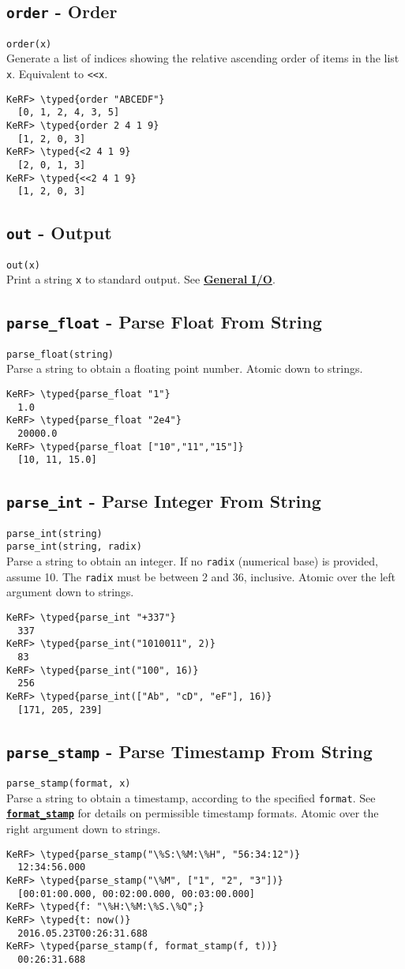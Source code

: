 \documentclass{article}
\newcommand{\typed}[1]{\textcolor{TealBlue}{#1}}
\newcommand{\primdefu}[3]{\subsection{\texttt{#1} - #2}\label{prim:#3}}
\newcommand{\primu}[2]{\hyperref[prim:#2]{\textbf{\texttt{#1}}}}
\newcommand{\primdef}[2]{\primdefu{#1}{#2}{#1}}
\begin{document}
\primdef{order}{Order}
\texttt{order(x)}\\

Generate a list of indices showing the relative ascending order of items in the list \texttt{x}. Equivalent to \texttt{<<x}.
\begin{Verbatim}
KeRF> \typed{order "ABCEDF"}
  [0, 1, 2, 4, 3, 5]
KeRF> \typed{order 2 4 1 9}
  [1, 2, 0, 3]
KeRF> \typed{<2 4 1 9}
  [2, 0, 1, 3]
KeRF> \typed{<<2 4 1 9}
  [1, 2, 0, 3]
\end{Verbatim}

\primdef{out}{Output}
\texttt{out(x)}\\

Print a string \texttt{x} to standard output. See \hyperref[sec:genio]{\textbf{General I/O}}.

\primdefu{parse\_float}{Parse Float From String}{parseFloat}
\texttt{parse\_float(string)}\\

Parse a string to obtain a floating point number. Atomic down to strings.
\begin{Verbatim}
KeRF> \typed{parse_float "1"}
  1.0
KeRF> \typed{parse_float "2e4"}
  20000.0
KeRF> \typed{parse_float ["10","11","15"]}
  [10, 11, 15.0]
\end{Verbatim}

\primdefu{parse\_int}{Parse Integer From String}{parseInt}
\texttt{parse\_int(string)}\\
\texttt{parse\_int(string, radix)}\\

Parse a string to obtain an integer. If no \texttt{radix} (numerical base) is provided, assume 10. The \texttt{radix} must be between 2 and 36, inclusive. Atomic over the left argument down to strings.
\begin{Verbatim}
KeRF> \typed{parse_int "+337"}
  337
KeRF> \typed{parse_int("1010011", 2)}
  83
KeRF> \typed{parse_int("100", 16)}
  256
KeRF> \typed{parse_int(["Ab", "cD", "eF"], 16)}
  [171, 205, 239]
\end{Verbatim}

\primdefu{parse\_stamp}{Parse Timestamp From String}{parseStamp}
\texttt{parse\_stamp(format, x)}\\

Parse a string to obtain a timestamp, according to the specified \texttt{format}. See \primu{format\_stamp}{formatStamp} for details on permissible timestamp formats. Atomic over the right argument down to strings.
\begin{Verbatim}
KeRF> \typed{parse_stamp("\%S:\%M:\%H", "56:34:12")}
  12:34:56.000
KeRF> \typed{parse_stamp("\%M", ["1", "2", "3"])}
  [00:01:00.000, 00:02:00.000, 00:03:00.000]
KeRF> \typed{f: "\%H:\%M:\%S.\%Q";}
KeRF> \typed{t: now()}
  2016.05.23T00:26:31.688
KeRF> \typed{parse_stamp(f, format_stamp(f, t))}
  00:26:31.688
\end{Verbatim}
\end{document}
